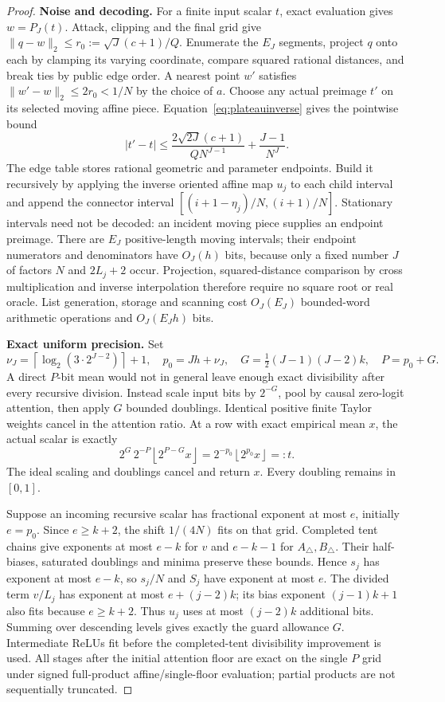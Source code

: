 \documentclass[11pt,letterpaper]{article}
\theoremstyle{definition}\newtheorem{definition}[theorem]{Definition}
\theoremstyle{remark}\newtheorem{remark}[theorem]{Remark}
\newcommand{\floor}[1]{\left\lfloor #1\right\rfloor}
\newcommand{\ceil}[1]{\left\lceil #1\right\rceil}
\begin{document}
\begin{proof}
\smallskip\noindent\textbf{Noise and decoding.}
For a finite input scalar $t$, exact evaluation gives $w=P_J(t)$. Attack, clipping and the final grid give
$\|q-w\|_2\le r_0:=\sqrt J(c+1)/Q$.
Enumerate the $E_J$ segments, project $q$ onto each by clamping its varying coordinate, compare squared rational distances, and break ties by public edge order. A nearest point $w'$ satisfies
$\|w'-w\|_2\le2r_0<1/N$ by the choice of $a$. Choose any actual preimage $t'$ on its selected moving affine piece. Equation~\eqref{eq:plateauinverse} gives the pointwise bound
\begin{equation}\label{eq:dyadicrecovery}
 |t'-t|\le\frac{2\sqrt{2J}(c+1)}{QN^{J-1}}+\frac{J-1}{N^J}.
\end{equation}
The edge table stores rational geometric and parameter endpoints. Build it recursively by applying the inverse oriented affine map $u_j$ to each child interval and append the connector interval $[(i+1-\eta_j)/N,(i+1)/N]$. Stationary intervals need not be decoded: an incident moving piece supplies an endpoint preimage. There are $E_J$ positive-length moving intervals; their endpoint numerators and denominators have $O_J(h)$ bits, because only a fixed number $J$ of factors $N$ and $2L_j+2$ occur. Projection, squared-distance comparison by cross multiplication and inverse interpolation therefore require no square root or real oracle. List generation, storage and scanning cost $O_J(E_J)$ bounded-word arithmetic operations and $O_J(E_Jh)$ bits.

\smallskip\noindent\textbf{Exact uniform precision.}
Set
\[
 \nu_J=\ceil{\log_2(3\cdot2^{J-2})}+1,\quad
 p_0=Jh+\nu_J,\quad G=\tfrac12(J-1)(J-2)k,\quad P=p_0+G.
\]
A direct $P$-bit mean would not in general leave enough exact divisibility after every recursive division. Instead scale input bits by $2^{-G}$, pool by causal zero-logit attention, then apply $G$ bounded doublings. Identical positive finite Taylor weights cancel in the attention ratio. At a row with exact empirical mean $x$, the actual scalar is exactly
\[
 2^G\,2^{-P}\floor{2^{P-G}x}=2^{-p_0}\floor{2^{p_0}x}=:t.
\]
The ideal scaling and doublings cancel and return $x$. Every doubling remains in $[0,1]$.

Suppose an incoming recursive scalar has fractional exponent at most $e$, initially $e=p_0$. Since $e\ge k+2$, the shift $1/(4N)$ fits on that grid. Completed tent chains give exponents at most $e-k$ for $v$ and $e-k-1$ for $A_\triangle,B_\triangle$. Their half-biases, saturated doublings and minima preserve these bounds. Hence $s_j$ has exponent at most $e-k$, so $s_j/N$ and $S_j$ have exponent at most $e$. The divided term $v/L_j$ has exponent at most $e+(j-2)k$; its bias exponent $(j-1)k+1$ also fits because $e\ge k+2$. Thus $u_j$ uses at most $(j-2)k$ additional bits. Summing over descending levels gives exactly the guard allowance $G$. Intermediate ReLUs fit before the completed-tent divisibility improvement is used. All stages after the initial attention floor are exact on the single $P$ grid under signed full-product affine/single-floor evaluation; partial products are not sequentially truncated.


\end{proof}
\end{document}
